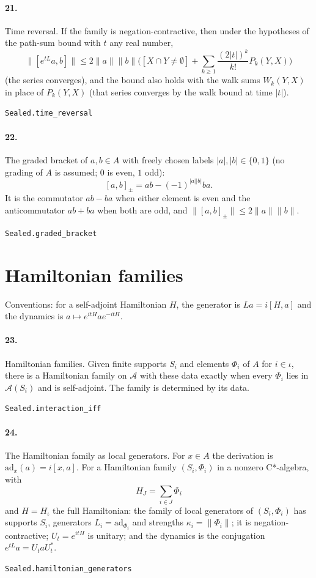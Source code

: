 \documentclass[11pt]{article}
\begin{document}
\paragraph{21.} Time reversal. If the family is negation-contractive, then under the hypotheses of the path-sum bound with $t$ any real number, \[\|[e^{tL} a, b]\| \le 2\|a\|\|b\| \bigl([X \cap Y \ne \emptyset] + \sum_{k \ge 1} \frac{(2|t|)^k}{k!} P_k(Y, X)\bigr)\] (the series converges), and the bound also holds with the walk sums $W_k(Y, X)$ in place of $P_k(Y, X)$ (that series converges by the walk bound at time $|t|$).\par{\footnotesize\texttt{Sealed.time\_reversal}}

\paragraph{22.} The graded bracket of $a, b \in A$ with freely chosen labels $|a|, |b| \in \{0, 1\}$ (no grading of $A$ is assumed; $0$ is even, $1$ odd): \[[a, b]_\pm = ab - (-1)^{|a||b|} ba.\] It is the commutator $ab - ba$ when either element is even and the anticommutator $ab + ba$ when both are odd, and $\|[a, b]_\pm\| \le 2\|a\|\|b\|$.\par{\footnotesize\texttt{Sealed.graded\_bracket}}

\section*{Hamiltonian families}
Conventions: for a self-adjoint Hamiltonian $H$, the generator is $L a = i[H, a]$ and the dynamics is $a \mapsto e^{itH} a e^{-itH}$.

\paragraph{23.} Hamiltonian families. Given finite supports $S_i$ and elements $\Phi_i$ of $A$ for $i \in \iota$, there is a Hamiltonian family on $\mathcal A$ with these data exactly when every $\Phi_i$ lies in $\mathcal A(S_i)$ and is self-adjoint. The family is determined by its data.\par{\footnotesize\texttt{Sealed.interaction\_iff}}

\paragraph{24.} The Hamiltonian family as local generators. For $x \in A$ the derivation is $\mathrm{ad}_x(a) = i[x, a]$. For a Hamiltonian family $(S_i, \Phi_i)$ in a nonzero C*-algebra, with \[H_J = \sum_{i \in J} \Phi_i\] and $H = H_\iota$ the full Hamiltonian: the family of local generators of $(S_i, \Phi_i)$ has supports $S_i$, generators $L_i = \mathrm{ad}_{\Phi_i}$ and strengths $\kappa_i = \|\Phi_i\|$; it is negation-contractive; $U_t = e^{itH}$ is unitary; and the dynamics is the conjugation $e^{tL} a = U_t a U_t^*$.\par{\footnotesize\texttt{Sealed.hamiltonian\_generators}}
\end{document}

